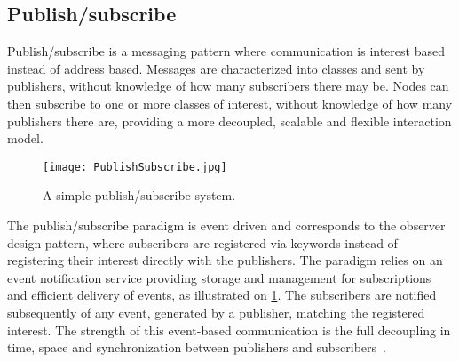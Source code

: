 




\subsection{Publish/subscribe}

Publish/subscribe is a messaging pattern where communication is interest based instead of address based. Messages are characterized into classes and sent by publishers, without knowledge of how many subscribers there may be. Nodes can then subscribe to one or more classes of interest, without knowledge of how many publishers there are, providing a more decoupled, scalable and flexible interaction model.

\begin{figure}
	\centering
	\texttt{[image: PublishSubscribe.jpg]} 
	\caption[Distributed Computing System with 2 nodes]{
		\label{fig:publishSubscribe} 
		\footnotesize{%
			A simple publish/subscribe system.
		}
	}
\end{figure}

The publish/subscribe paradigm is event driven and corresponds to the observer design pattern, where subscribers are registered via keywords instead of registering their interest directly with the publishers. The paradigm relies on an event notification service providing storage and management for subscriptions and efficient delivery of events, as illustrated on \cref{fig:publishSubscribe}. The subscribers are notified subsequently of any event, generated by a publisher, matching the registered interest. The strength of this event-based communication is the full decoupling in time, space and synchronization between publishers and subscribers~\cite{eugster2003many}.




